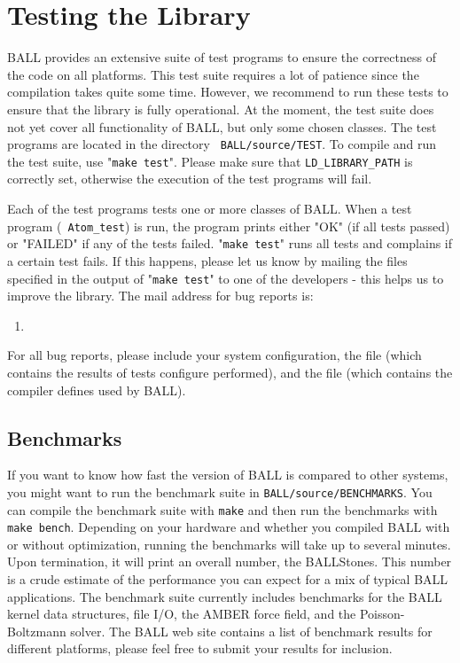 \section{Testing the Library}

BALL provides an extensive suite of test programs to ensure the correctness of
the code on all platforms. This test suite requires a lot of patience since
the compilation takes quite some time. However, we recommend to run these
tests to ensure that the library is fully operational. At the moment, the test
suite does not yet cover all functionality of BALL, but only some chosen
classes.  The test programs are located in the directory {\tt
BALL/source/TEST}.  To compile and run the test suite, use "{\tt make test}".
Please make sure that {\tt LD\_LIBRARY\_PATH} is correctly set, otherwise the
execution of the test programs will fail.

Each of the test programs tests one or more classes of BALL. When a test
program (\eg~{\tt Atom\_test}) is run, the program prints either "OK" (if all
tests passed) or "FAILED" if any of the tests failed. "{\tt make test}" runs
all tests and complains if a certain test fails.  If this happens, please let
us know by mailing the files specified in the output of "{\tt make test}" to
one of the developers - this helps us to improve the library.  The mail
address for bug reports is:
\begin{enumerate}
	\item[] 
\end{enumerate}

\noindent
For all bug reports, please include your system configuration, the file
 (which contains the results of tests configure performed),
and the file  (which contains the compiler
defines used by BALL).

\subsection{Benchmarks}

If you want to know how fast the version of BALL is compared to other systems,
you might want to run the benchmark suite in {\tt BALL/source/BENCHMARKS}.
You can compile the benchmark suite with {\tt make} and then run the
benchmarks with {\tt make bench}. Depending on your hardware and 
whether you compiled BALL with or without optimization, running the benchmarks
will take up to several minutes. Upon termination, it will print an overall
number, the BALLStones. This number is a crude estimate of the performance you
can expect for a mix of typical BALL applications. The benchmark suite
currently includes benchmarks for the BALL kernel data structures, file I/O,
the AMBER force field, and the Poisson-Boltzmann solver. The BALL web site
contains a list of benchmark results for different platforms, please feel free
to submit your results for inclusion.
